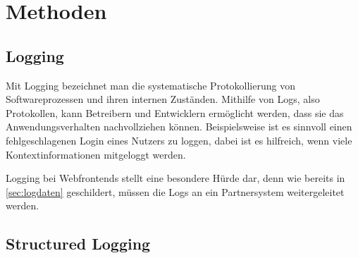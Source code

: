 

\vspace{-\baselineskip}

\section{Methoden}

\subsection{Logging}


Mit Logging bezeichnet man die systematische Protokollierung von Softwareprozessen und ihren internen Zuständen. Mithilfe von Logs, also Protokollen, kann Betreibern und Entwicklern ermöglicht werden, dass sie das Anwendungsverhalten nachvollziehen können. Beispielsweise ist es sinnvoll einen fehlgeschlagenen Login eines Nutzers zu loggen, dabei ist es hilfreich, wenn viele Kontextinformationen mitgeloggt werden. %

Logging bei Webfrontends stellt eine besondere Hürde dar, denn wie bereits in \autoref{sec:logdaten} geschildert, müssen die Logs an ein Partnersystem weitergeleitet werden.

\subsection{Structured Logging}

